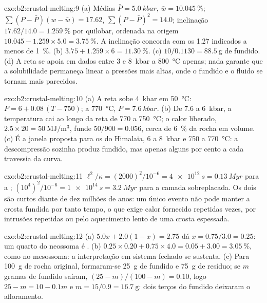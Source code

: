 \begin{solution}{exo:b2:crustal-melting:9}
(a) Médias $\bar P = \qty{5.0}{kbar}$, $\bar w = \qty{10.045}{\percent}$;
$\sum(P - \bar P)(w - \bar w) = 17.62$, $\sum(P - \bar P)^2 = 14.0$; inclinação
$17.62/14.0 = \qty{1.259}{\percent}$ por quilobar, ordenada na origem $10.045 - 1.259\times5.0 =
\qty{3.75}{\percent}$. A inclinação concorda com os 1.27 indicados a menos de
\qty{1}{\percent}. (b) $3.75 + 1.259\times6 = \qty{11.30}{\percent}$. (c) $10/0.1130 =
\qty{88.5}{\gram}$ de fundido. (d) A reta se apoia em dados entre 3 e \qty{8}{kbar} a
\qty{800}{\celsius} apenas; nada garante que a solubilidade permaneça linear a pressões
mais altas, onde o fundido e o fluido se tornam mais parecidos.
\end{solution}

\begin{solution}{exo:b2:crustal-melting:10}
(a) A reta sobe \qty{4}{kbar} em \qty{50}{\celsius}: $P = 6 + 0.08\,(T - 750)$;
a \qty{770}{\celsius}, $P = \qty{7.6}{kbar}$. (b) De 7.6 a \qty{6}{kbar}, a
temperatura cai ao longo da reta de 770 a \qty{750}{\celsius}; o calor liberado,
$2.5\times20 = \qty{50}{\mega\joule\per\cubic\metre}$, funde $50/900 = 0.056$, cerca de
\qty{6}{\percent} da rocha em volume. (c) É a janela proposta para os
 do Himalaia, 6 a \qty{8}{kbar} e 750 a \qty{770}{\celsius}: a descompressão
sozinha produz fundido, mas apenas alguns por cento a cada travessia da curva.
\end{solution}

\begin{solution}{exo:b2:crustal-melting:11}
$\ell^2/\kappa = (2000)^2/10^{-6} = \qty{4e12}{s} = \qty{0.13}{Myr}$ para a ;
$(10^4)^2/10^{-6} = \qty{1e14}{s} = \qty{3.2}{Myr}$ para a camada sobreplacada. Os dois são curtos
diante de dez milhões de anos: um único evento não pode manter a crosta fundida por tanto tempo, o que exige
calor fornecido repetidas vezes, por intrusões repetidas ou pelo aquecimento lento de uma
crosta espessada.
\end{solution}

\begin{solution}{exo:b2:crustal-melting:12}
(a) $5.0x + 2.0(1 - x) = 2.75$ dá $x = 0.75/3.0 = 0.25$: um quarto do neossoma é
. (b) $0.25\times0.20 + 0.75\times4.0 = 0.05 + 3.00 = \qty{3.05}{\percent}$, como
no mesossoma: a interpretação em sistema fechado se sustenta. (c) Para \qty{100}{\gram} de
rocha original, formaram-se \qty{25}{\gram} de fundido e \qty{75}{\gram} de resíduo; se $m$ gramas de
fundido saíram, $(25 - m)/(100 - m) = 0.10$, logo $25 - m = 10 - 0.1m$ e $m = 15/0.9 =
\qty{16.7}{\gram}$: dois terços do fundido deixaram o afloramento.
\end{solution}


